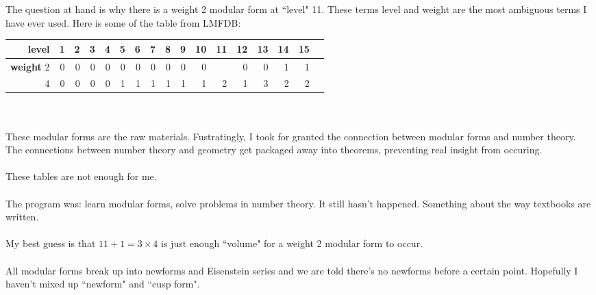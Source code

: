 \documentclass[12pt]{article}
\begin{document}
\newpage

\noindent The question at hand is why there is a weight 2 modular form at ``level" 11.  These terms level and weight are the most ambiguous terms I have ever used.  Here is some of the table from LMFDB: \\

\begin{tabular}{r|rrrrrrrrrrrrrrrr}

 \textbf{level} & 1 & 2 & 3 & 4 & 5 & 6 & 7 & 8 & 9 & 10 & 11 & 12 & 13 & 14 & 15 \\ \hline
\textbf{weight }2 & 0 & 0 & 0 & 0 & 0 & 0 & 0 & 0 & 0 & 0  & \color{red!60!white}{\textbf{1}}  & 0  & 0  &  1 &  1 \\ 
4 & 0 & 0 & 0 & 0 & 1 & 1 & 1 & 1 & 1 & 1 & 2  & 1  & 3  & 2  &  2 
\end{tabular} \\ \\
These modular forms are the raw materials.  Fustratingly, I took for granted the connection between modular forms and number theory.  The connections between number theory and geometry get packaged away into theorems, preventing real insight from occuring. \\ \\
These tables are not enough for me.  \\ \\
The program was: learn modular forms, solve problems in number theory.  It still hasn't happened.  Something about the way textbooks are written. \\ \\
My best guess is that $11 + 1 = 3 \times 4$ is just enough ``volume" for a weight 2 modular form to occur.  \\ \\ 
All modular forms break up into newforms and Eisenstein series and we are told there's no newforms before a certain point.  Hopefully I haven't mixed up ``newform" and ``cusp form".   \\ 
\end{document}

